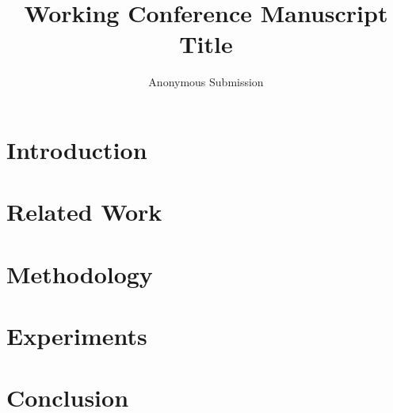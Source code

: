 \documentclass[10pt,twocolumn,letterpaper]{article}
\title{Working Conference Manuscript Title}
\author{Anonymous Submission}
\date{}
\begin{document}
\maketitle

\begin{abstract}
\end{abstract}

\section{Introduction}
\label{sec:intro}

\section{Related Work}
\label{sec:related}

\section{Methodology}
\label{sec:method}

\section{Experiments}
\label{sec:experiments}

\section{Conclusion}
\label{sec:conclusion}



\end{document}
